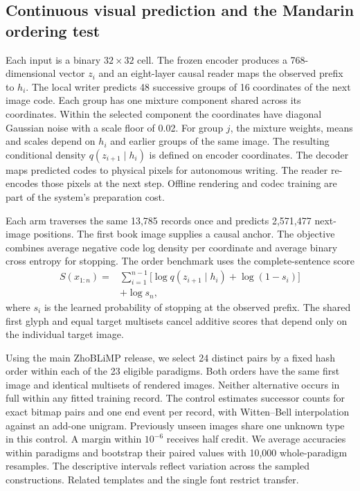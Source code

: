 \documentclass[12pt,a4paper]{article}
\providecommand{\DIFadd}[1]{{\protect\color{blue} \sf #1}} %
\begin{document}
\subsection*{\DIFadd{Continuous visual prediction and the Mandarin ordering test}}
\DIFadd{Each input is a binary $32\times32$ cell. The frozen encoder produces
a 768-dimensional vector $z_i$ and an eight-layer causal reader maps the
observed prefix to $h_i$. The local writer predicts 48 successive groups of
16 coordinates of the next image code. Each group has one mixture component
shared across its coordinates. Within the selected component the coordinates
have diagonal Gaussian noise with a scale floor of 0.02. For group $j$,
the mixture weights, means and scales depend on $h_i$ and earlier groups
of the same image. The resulting conditional density $q(z_{i+1}\mid h_i)$
is defined on encoder coordinates. The decoder maps predicted codes to
physical pixels for autonomous writing. The reader re-encodes those pixels
at the next step. Offline rendering and codec training are part of the
system's preparation cost.
}

\DIFadd{Each arm traverses the same 13,785 records once and predicts 2,571,477
next-image positions. The first book image supplies a causal anchor.
The objective combines average negative code log density per coordinate
and average binary cross entropy for stopping. The order benchmark uses the
complete-sentence score
}\begin{align}
 S(x_{1:n})={}&\sum_{i=1}^{n-1}\bigl[\log q(z_{i+1}\mid h_i)
                   +\log(1-s_i)\bigr] \nonumber\\
              &+\log s_n ,
\end{align}
\DIFadd{where $s_i$ is the learned probability of stopping at the observed prefix.
The shared first glyph and equal target multisets cancel additive scores
that depend only on the individual target image.
}

\DIFadd{Using the main ZhoBLiMP release\cite{zhoblimp}, we select 24 distinct pairs
by a fixed hash order within each of the 23 eligible paradigms. Both orders
have the same first image and identical multisets of rendered images.
Neither alternative occurs in full within any fitted training record.
The control estimates successor counts for exact bitmap pairs and one end
event per record, with Witten--Bell interpolation against an add-one unigram.
Previously unseen images share one unknown type in this control.
A margin within $10^{-6}$ receives half credit. We average accuracies within
paradigms and bootstrap their paired values with 10,000 whole-paradigm
resamples. The descriptive intervals reflect variation across the sampled
constructions. Related templates and the single font restrict transfer.
}
\end{document}
